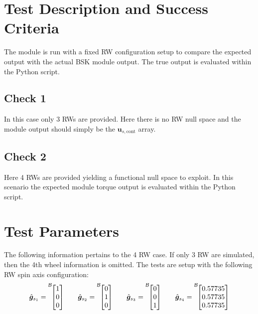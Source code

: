 
\section{Test Description and Success Criteria}
The module is run with a fixed RW configuration setup to compare the expected output with the actual BSK module output.  The true output is evaluated within the Python script.

\subsection{Check 1}
In this case only 3 RWs are provided.  Here there is no RW null space and the module output should simply be the $\bm u_{s,\text{cont}}$ array.

\subsection{Check 2}
Here 4 RWs are provided yielding a functional null space to exploit.  In this scenario the expected module torque output is evaluated within the Python script.





\section{Test Parameters}
The following information pertains to the 4 RW case. If only 3 RW are simulated, then the 4th wheel information is omitted.  The tests are setup with the following RW spin axis configuration:
\begin{equation}
\hat{\bm g}_{s_{1}} = \leftexp{B}{\begin{bmatrix} 1 \\ 0 \\ 0 \end{bmatrix}}
\quad\quad
\hat{\bm g}_{s_{2}} = \leftexp{B}{\begin{bmatrix} 0 \\ 1 \\ 0 \end{bmatrix}}
\quad\quad
\hat{\bm g}_{s_{3}} = \leftexp{B}{\begin{bmatrix} 0 \\ 0 \\ 1 \end{bmatrix}}
\quad\quad
\hat{\bm g}_{s_{4}} = \leftexp{B}{\begin{bmatrix} 0.57735 \\ 0.57735 \\ 0.57735 \end{bmatrix}}
\end{equation}

